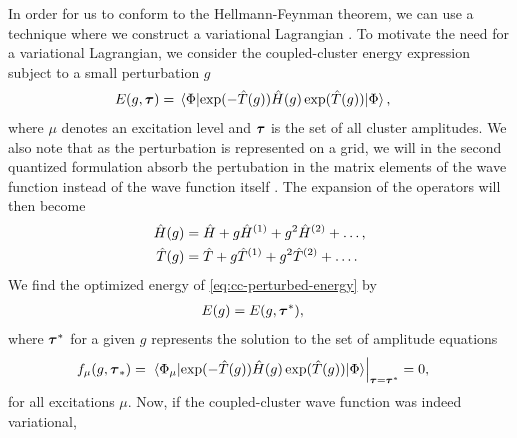             In order for us to conform to the Hellmann-Feynman theorem, we can
            use a technique where we construct a variational Lagrangian
            \cite{helgaker1989, helgaker-molecular}.
            To motivate the need for a variational Lagrangian, we consider the
            coupled-cluster energy expression subject to a small perturbation
            $g$ \cite{monkhorst1977421}
            \begin{align}
                E(g, \vfg{\clustamp})
                &= \mel*{\slat}{
                    \exponential(-\clust(g))
                    \hamil(g)
                    \exponential(\clust(g))
                }{\slat},
                \label{eq:cc-perturbed-energy}
            \end{align}
            where $\mu$ denotes an excitation level and $\boldsymbol{\tau}$ is the
            set of all cluster amplitudes.
            We also note that as the perturbation is represented on a grid, we
            will in the second quantized formulation absorb the pertubation in
            the matrix elements of the wave function instead of the wave
            function itself \cite{helgaker-molecular}.
            The expansion of the operators will then become
            \cite{monkhorst1977421}
            \begin{align}
                \hat{H}(g) &= \hat{H} + g\hat{H}^{(1)} + g^2\hat{H}^{(2)} + \dots, \\
                \hat{T}(g) &= \hat{T} + g\hat{T}^{(1)} + g^2\hat{T}^{(2)} + \dots.
            \end{align}
            We find the optimized energy of \autoref{eq:cc-perturbed-energy} by
            \begin{align}
                E(g) &= E(g, \boldsymbol{\tau}^{*}),
            \end{align}
            where $\boldsymbol{\tau}^{*}$ for a given $g$ represents the solution
            to the set of amplitude equations
            \begin{align}
                f_{\mu}(g, \vfg{\clustamp}_{*})
                &=
                \left.
                \mel*{\Phi_{\mu}}{
                    \exponential(-\clust(g))
                    \hamil(g)
                    \exponential(\clust(g))
                }{\slat}
                \right\rvert_{\vfg{\clustamp} = \vfg{\clustamp}^{*}}
                = 0,
                \label{eq:cc-amplitude-set}
            \end{align}
            for all excitations $\mu$.
            Now, if the coupled-cluster wave function was indeed variational,
